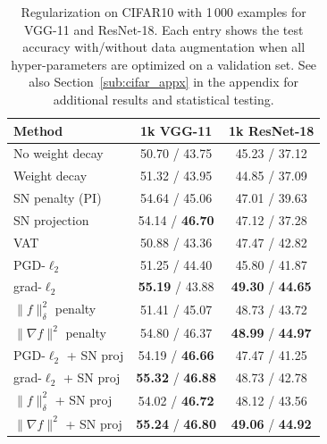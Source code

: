 \begin{table}[tb]
\caption{Regularization on CIFAR10 with 1\,000 examples for VGG-11 and ResNet-18.
Each entry shows the test accuracy with/without data augmentation when all hyper-parameters are optimized on a validation set.
See also Section~\ref{sub:cifar_appx} in the appendix for additional results and statistical testing.
}

\label{tab:smalldata}
\centering
\small
\vspace{0.2cm}
\begin{tabular}{ | l | c | c |  }
\hline
Method & 1k VGG-11 & 1k ResNet-18 \\ \hline
\hline
No weight decay & 50.70 / 43.75 & 45.23 / 37.12 \\
Weight decay & 51.32 / 43.95 & 44.85 / 37.09 \\
SN penalty (PI) & 54.64 / 45.06 & 47.01 / 39.63 \\
SN projection & 54.14 / \textbf{\color{darkgray}46.70} & 47.12 / 37.28 \\
VAT & 50.88 / 43.36 & 47.47 / 42.82 \\
PGD-$\ell_2$ & 51.25 / 44.40 & 45.80 / 41.87 \\
grad-$\ell_2$ & \textbf{\color{darkgray}55.19} / 43.88 & \textbf{49.30} / \textbf{\color{darkgray}44.65} \\
\hline
$\|f\|_\delta^2$ penalty & 51.41 / 45.07 & 48.73 / 43.72 \\
$\|\nabla f\|^2$ penalty & 54.80 / 46.37 & \textbf{\color{darkgray}48.99} / \textbf{44.97} \\
PGD-$\ell_2$ + SN proj & 54.19 / \textbf{\color{darkgray}46.66} & 47.47 / 41.25 \\
grad-$\ell_2$ + SN proj & \textbf{55.32} / \textbf{46.88} & 48.73 / 42.78 \\
$\|f\|_\delta^2$ + SN proj & 54.02 / \textbf{\color{darkgray}46.72} & 48.12 / 43.56 \\
$\|\nabla f\|^2$ + SN proj & \textbf{55.24} / \textbf{46.80} & \textbf{\color{darkgray}49.06} / \textbf{44.92} \\
\hline
\end{tabular}
\end{table}

